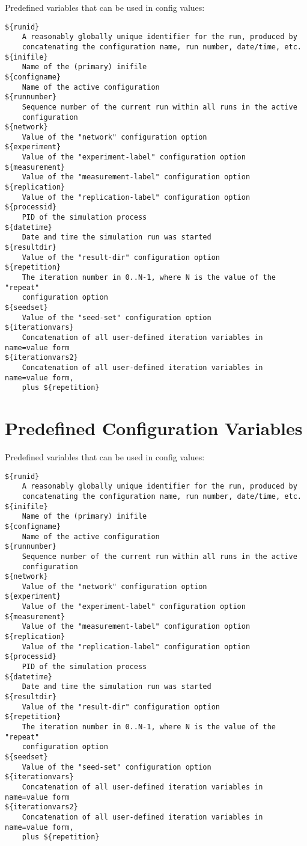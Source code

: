 Predefined variables that can be used in config values:

\begin{verbatim}
${runid}
    A reasonably globally unique identifier for the run, produced by
    concatenating the configuration name, run number, date/time, etc.
${inifile}
    Name of the (primary) inifile
${configname}
    Name of the active configuration
${runnumber}
    Sequence number of the current run within all runs in the active
    configuration
${network}
    Value of the "network" configuration option
${experiment}
    Value of the "experiment-label" configuration option
${measurement}
    Value of the "measurement-label" configuration option
${replication}
    Value of the "replication-label" configuration option
${processid}
    PID of the simulation process
${datetime}
    Date and time the simulation run was started
${resultdir}
    Value of the "result-dir" configuration option
${repetition}
    The iteration number in 0..N-1, where N is the value of the "repeat"
    configuration option
${seedset}
    Value of the "seed-set" configuration option
${iterationvars}
    Concatenation of all user-defined iteration variables in name=value form
${iterationvars2}
    Concatenation of all user-defined iteration variables in name=value form,
    plus ${repetition}
\end{verbatim}



\section{Predefined Configuration Variables}

Predefined variables that can be used in config values:

\begin{verbatim}
${runid}
    A reasonably globally unique identifier for the run, produced by
    concatenating the configuration name, run number, date/time, etc.
${inifile}
    Name of the (primary) inifile
${configname}
    Name of the active configuration
${runnumber}
    Sequence number of the current run within all runs in the active
    configuration
${network}
    Value of the "network" configuration option
${experiment}
    Value of the "experiment-label" configuration option
${measurement}
    Value of the "measurement-label" configuration option
${replication}
    Value of the "replication-label" configuration option
${processid}
    PID of the simulation process
${datetime}
    Date and time the simulation run was started
${resultdir}
    Value of the "result-dir" configuration option
${repetition}
    The iteration number in 0..N-1, where N is the value of the "repeat"
    configuration option
${seedset}
    Value of the "seed-set" configuration option
${iterationvars}
    Concatenation of all user-defined iteration variables in name=value form
${iterationvars2}
    Concatenation of all user-defined iteration variables in name=value form,
    plus ${repetition}
\end{verbatim}

